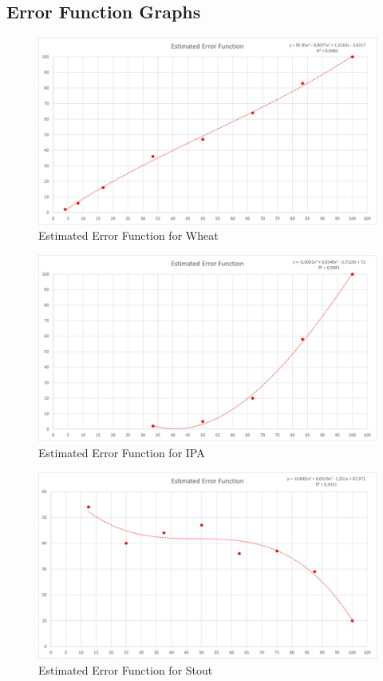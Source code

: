 \subsection{Error Function Graphs}\label{app:error_function_graphs}

\begin{figure}[H]
	\centering
	\includegraphics[width=1\linewidth]{images/errorfunction/wheat.png}
	\caption{Estimated Error Function for Wheat}
\end{figure}

\begin{figure}[H]
	\centering
	\includegraphics[width=1\linewidth]{images/errorfunction/ipa.png}
	\caption{Estimated Error Function for IPA}
\end{figure}

\begin{figure}[H]
	\centering
	\includegraphics[width=1\linewidth]{images/errorfunction/stout.png}
	\caption{Estimated Error Function for Stout}
\end{figure}

